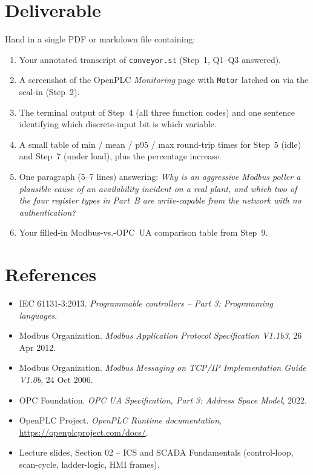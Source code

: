 \documentclass[11pt,a4paper]{article}
\begin{document}
\section*{Deliverable}

\begin{deliverbox}
Hand in a single PDF or markdown file containing:
\begin{enumerate}\setlength{\itemsep}{1pt}
  \item Your annotated transcript of \texttt{conveyor.st} (Step~1, Q1--Q3 answered).
  \item A screenshot of the OpenPLC \emph{Monitoring} page with \texttt{Motor} latched on via the seal-in (Step~2).
  \item The terminal output of Step~4 (all three function codes) and one sentence identifying which discrete-input bit is which variable.
  \item A small table of min / mean / p95 / max round-trip times for Step~5 (idle) and Step~7 (under load), plus the percentage increase.
  \item One paragraph (5--7 lines) answering: \emph{Why is an aggressive Modbus poller a plausible cause of an availability incident on a real plant, and which two of the four register types in Part~B are write-capable from the network with no authentication?}
  \item Your filled-in Modbus-vs.-OPC~UA comparison table from Step~9.
\end{enumerate}
\end{deliverbox}

\section*{References}

\begin{itemize}\setlength{\itemsep}{1pt}
  \item IEC 61131-3:2013. \emph{Programmable controllers -- Part 3: Programming languages.}
  \item Modbus Organization. \emph{Modbus Application Protocol Specification V1.1b3}, 26 Apr 2012.
  \item Modbus Organization. \emph{Modbus Messaging on TCP/IP Implementation Guide V1.0b}, 24 Oct 2006.
  \item OPC Foundation. \emph{OPC UA Specification, Part 3: Address Space Model}, 2022.
  \item OpenPLC Project. \emph{OpenPLC Runtime documentation}, \url{https://openplcproject.com/docs/}.
  \item Lecture slides, Section 02 -- ICS and SCADA Fundamentals (control-loop, scan-cycle, ladder-logic, HMI frames).
\end{itemize}
\end{document}
